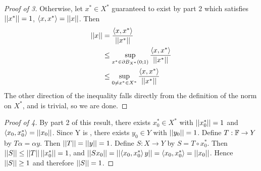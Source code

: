 \begin{thm}
\begin{proof}[Proof of 3]
    Otherwise, let  $x^* \in X^*$ guaranteed to 
    exist by part 2 which satisfies $\left|\left| x^* \right|\right|=1$, 
    $\left\langle x,x^* \right\rangle = \left|\left| x \right|\right|$. 
    Then 
    \begin{align*}
    \left|\left| x \right|\right| & = \frac{\left\langle x,x^* \right\rangle}{\left|\left| x^* \right|\right|} \\
    & \leq \sup\limits_{x^* \in \partial B_{X^*}(0;1)} \frac{\left\langle x,x^* \right\rangle}{\left|\left| x^* \right|\right|} \\
    & \leq    \sup\limits_{0 \neq x^* \in X^*} \frac{\left\langle x,x^* \right\rangle}{\left|\left| x^* \right|\right|} 
    \end{align*}
    The other direction of the inequality
    falls directly from the definition of 
    the norm on $X^*$, and is trivial, so 
    we are done. 
\end{proof}
\begin{proof}[Proof of 4]
    By part 2 of this result, there exists $x_0^* \in X^*$ with 
    $\left|\left| x_0^* \right|\right| = 1$ and $\left\langle x_0, x_0^* \right\rangle=\left|\left| x_0 \right|\right|$. 
    Since Y is \NonDegenerate, there
    exists $y_0 \in Y$ with $\left|\left| y_0 \right|\right| = 1$. 
    Define $T: \mathbb{F} \to Y$ by $T \alpha = \alpha y$.
    Then $\left|\left| T \right|\right| = \left|\left| y \right|\right| = 1$. 
    Define $S: X \to Y$ by $S=T \circ x_0^*$. 
    Then $\left|\left| S \right|\right| \leq \left|\left| T \right|\right| \left|\left| x_0^* \right|\right| = 1$, and
    $\left|\left| S x_0 \right|\right| = \left|\left| \left\langle x_0, x_0^* \right\rangle y \right|\right| = \left\langle x_0, x_0^* \right\rangle = \left|\left| x_0 \right|\right|$. 
    Hence $\left|\left| S \right|\right| \geq 1$ and therefore $\left|\left| S \right|\right| = 1$. 
\end{proof}
\end{thm}

